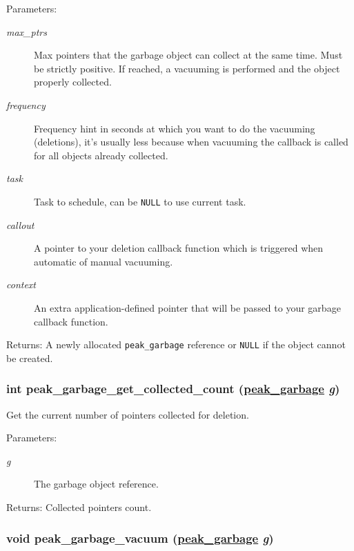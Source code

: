 \begin{Desc}
\item[Parameters:]
\begin{description}
\item[{\em max\_\-ptrs}]Max pointers that the garbage object can collect at the same time. Must be strictly positive. If reached, a vacuuming is performed and the object properly collected. \item[{\em frequency}]Frequency hint in seconds at which you want to do the vacuuming (deletions), it's usually less because when vacuuming the callback is called for all objects already collected. \item[{\em task}]Task to schedule, can be {\tt NULL} to use current task. \item[{\em callout}]A pointer to your deletion callback function which is triggered when automatic of manual vacuuming. \item[{\em context}]An extra application-defined pointer that will be passed to your garbage callback function.\end{description}
\end{Desc}
\begin{Desc}
\item[Returns:]A newly allocated {\tt peak\_\-garbage} reference or {\tt NULL} if the object cannot be created. \end{Desc}
\hypertarget{group__garbage_ga4}{
\subsubsection[peak\_\-garbage\_\-get\_\-collected\_\-count]{\setlength{\rightskip}{0pt plus 5cm}int peak\_\-garbage\_\-get\_\-collected\_\-count (\hyperlink{group__garbage_ga0}{peak\_\-garbage} {\em g})}}
\label{group__garbage_ga4}


Get the current number of pointers collected for deletion. 

\begin{Desc}
\item[Parameters:]
\begin{description}
\item[{\em g}]The garbage object reference.\end{description}
\end{Desc}
\begin{Desc}
\item[Returns:]Collected pointers count. \end{Desc}
\hypertarget{group__garbage_ga5}{
\subsubsection[peak\_\-garbage\_\-vacuum]{\setlength{\rightskip}{0pt plus 5cm}void peak\_\-garbage\_\-vacuum (\hyperlink{group__garbage_ga0}{peak\_\-garbage} {\em g})}}
\label{group__garbage_ga5}


